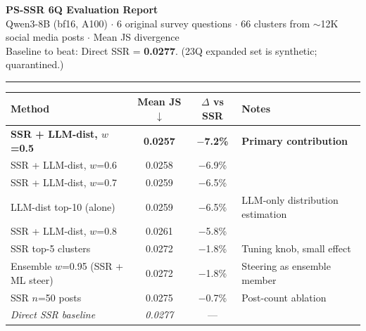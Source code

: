 \documentclass[10pt,a4paper]{article}
\begin{document}
\begin{center}
{\Large\bfseries PS-SSR 6Q Evaluation Report}\\[4pt]
{\small Qwen3-8B (bf16, A100) $\cdot$ 6 original survey questions $\cdot$ 66 clusters from $\sim$12K social media posts $\cdot$ Mean JS divergence}\\[2pt]
{\footnotesize Baseline to beat: Direct SSR = \textbf{0.0277}. (23Q expanded set is synthetic; quarantined.)}
\end{center}

\vspace{-4pt}
\hrule
\vspace{6pt}

\vspace{-4pt}
\centering\small
\begin{tabular}{@{}lccl@{}}
\toprule
Method & Mean JS $\downarrow$ & $\Delta$ vs SSR & Notes \\
\midrule
\rowcolor{bestrow} \textbf{SSR + LLM-dist, $w$=0.5} & \textbf{0.0257} & \textbf{$-$7.2\%} & \textbf{Primary contribution} \\
SSR + LLM-dist, $w$=0.6 & 0.0258 & $-$6.9\% & \\
SSR + LLM-dist, $w$=0.7 & 0.0259 & $-$6.5\% & \\
LLM-dist top-10 (alone) & 0.0259 & $-$6.5\% & LLM-only distribution estimation \\
SSR + LLM-dist, $w$=0.8 & 0.0261 & $-$5.8\% & \\
SSR top-5 clusters & 0.0272 & $-$1.8\% & Tuning knob, small effect \\
Ensemble $w$=0.95 (SSR + ML steer) & 0.0272 & $-$1.8\% & Steering as ensemble member \\
SSR $n$=50 posts & 0.0275 & $-$0.7\% & Post-count ablation \\
\midrule
\textit{Direct SSR baseline} & \textit{0.0277} & --- & \\
\bottomrule
\end{tabular}

\vspace{8pt}
\end{document}
